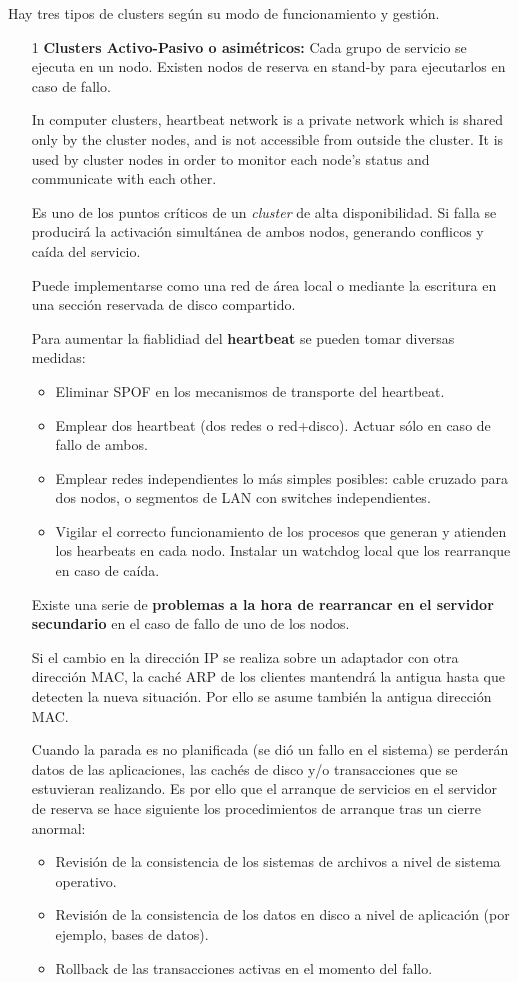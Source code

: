 Hay tres tipos de clusters según su modo de funcionamiento y gestión.
\begin{enumerate}
\item[1] \textbf{Clusters Activo-Pasivo o asimétricos:} Cada grupo de servicio se ejecuta en un nodo. Existen nodos de reserva en stand-by para ejecutarlos en caso de fallo.

\begin{defn}[Heartbeat]
In computer clusters, heartbeat network is a private network which is shared only by the cluster nodes, and is not accessible from outside the cluster. It is used by cluster nodes in order to monitor each node's status and communicate with each other.

Es uno de los puntos críticos de un \textit{cluster} de alta disponibilidad. Si falla se producirá la activación simultánea de ambos nodos, generando conflicos y caída del servicio.

Puede implementarse como una red de área local o mediante la escritura en una sección reservada de disco compartido.
\end{defn}

Para aumentar la fiablidiad del \textbf{heartbeat} se pueden tomar diversas medidas:
\begin{itemize}
\item Eliminar SPOF en los mecanismos de transporte del heartbeat.
\item Emplear dos heartbeat (dos redes o red+disco). Actuar sólo en caso de fallo
de ambos.
\item Emplear redes independientes lo más simples posibles: cable cruzado para
dos nodos, o segmentos de LAN con switches independientes.
\item Vigilar el correcto funcionamiento de los procesos que generan y atienden los
hearbeats en cada nodo. Instalar un watchdog local que los rearranque en caso de caída.
\end{itemize}

Existe una serie de \textbf{problemas a la hora de rearrancar en el servidor secundario} en el caso de fallo de uno de los nodos.

Si el cambio en la dirección IP se realiza sobre un adaptador con otra dirección MAC, la caché ARP de los clientes mantendrá la antigua hasta que detecten la nueva situación. Por ello se asume también la antigua dirección MAC.

Cuando la parada es no planificada (se dió un fallo en el sistema) se perderán datos de las aplicaciones, las cachés de disco y/o transacciones que se estuvieran realizando. Es por ello que el arranque de servicios en el servidor de reserva se hace siguiente los procedimientos de arranque tras un cierre anormal:
\begin{itemize}
\item Revisión de la consistencia de los sistemas de archivos a nivel de sistema operativo.
\item Revisión de la consistencia de los datos en disco a nivel de aplicación (por ejemplo, bases de datos).
\item Rollback de las transacciones activas en el momento del fallo.
\end{itemize}


\end{enumerate}
